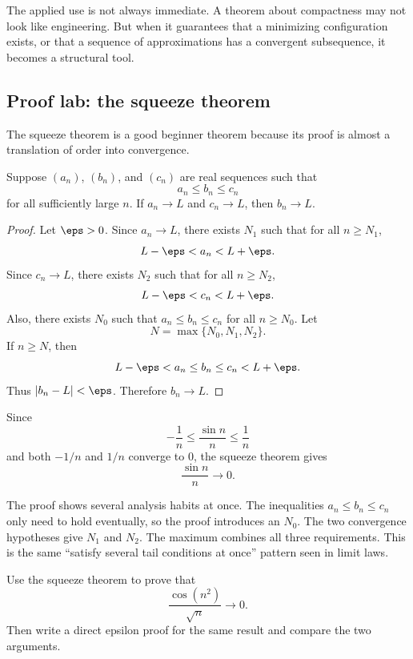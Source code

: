 The applied use is not always immediate. A theorem about compactness may not
look like engineering. But when it guarantees that a minimizing configuration
exists, or that a sequence of approximations has a convergent subsequence, it
becomes a structural tool.

\subsection{Proof lab: the squeeze theorem}

The squeeze theorem is a good beginner theorem because its proof is almost a
translation of order into convergence.

\begin{theorem}
Suppose $(a_n)$, $(b_n)$, and $(c_n)$ are real sequences such that
\[
a_n\leq b_n\leq c_n
\]
for all sufficiently large $n$. If $a_n\to L$ and $c_n\to L$, then
$b_n\to L$.
\end{theorem}

\begin{proof}
Let $\eps>0$. Since $a_n\to L$, there exists $N_1$ such that for all
$n\geq N_1$,
\[
L-\eps<a_n<L+\eps.
\]
Since $c_n\to L$, there exists $N_2$ such that for all $n\geq N_2$,
\[
L-\eps<c_n<L+\eps.
\]
Also, there exists $N_0$ such that $a_n\leq b_n\leq c_n$ for all $n\geq N_0$.
Let
\[
N=\max\{N_0,N_1,N_2\}.
\]
If $n\geq N$, then
\[
L-\eps<a_n\leq b_n\leq c_n<L+\eps.
\]
Thus $|b_n-L|<\eps$. Therefore $b_n\to L$.
\end{proof}

\begin{example}
Since
\[
-\frac1n\leq \frac{\sin n}{n}\leq \frac1n
\]
and both $-1/n$ and $1/n$ converge to $0$, the squeeze theorem gives
\[
\frac{\sin n}{n}\to 0.
\]
\end{example}

The proof shows several analysis habits at once. The inequalities $a_n\leq
b_n\leq c_n$ only need to hold eventually, so the proof introduces an $N_0$.
The two convergence hypotheses give $N_1$ and $N_2$. The maximum combines all
three requirements. This is the same ``satisfy several tail conditions at once''
pattern seen in limit laws.

\begin{labbox}
Use the squeeze theorem to prove that
\[
\frac{\cos(n^2)}{\sqrt n}\to 0.
\]
Then write a direct epsilon proof for the same result and compare the two
arguments.
\end{labbox}

